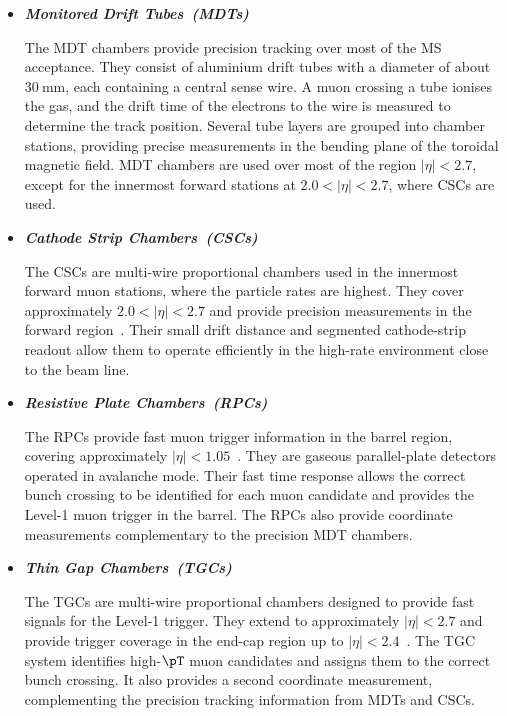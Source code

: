 \begin{itemize}
    \item \textbf{\textit{Monitored Drift Tubes~(MDTs)\quad}}

    The MDT chambers provide precision tracking over most of the MS acceptance.
    They consist of aluminium drift tubes with a diameter of about $30~\mathrm{mm}$, each containing a central sense wire.
    A muon crossing a tube ionises the gas, and the drift time of the electrons to the wire is measured to determine the track position.
    Several tube layers are grouped into chamber stations, providing precise measurements in the bending plane of the toroidal magnetic field.
    MDT chambers are used over most of the region $|\eta|<2.7$, except for the innermost forward stations at $2.0<|\eta|<2.7$, where CSCs are used.

    \item \textbf{\textit{Cathode Strip Chambers~(CSCs)\quad}}

    The CSCs are multi-wire proportional chambers used in the innermost forward muon stations, where the particle rates are highest.
    They cover approximately $2.0<|\eta|<2.7$ and provide precision measurements in the forward region~\cite{ATLASDetector2008}.
    Their small drift distance and segmented cathode-strip readout allow them to operate efficiently in the high-rate environment close to the beam line.

    \item \textbf{\textit{Resistive Plate Chambers~(RPCs)\quad}}

    The RPCs provide fast muon trigger information in the barrel region, covering approximately $|\eta|<1.05$~\cite{ATLASDetector2008}.
    They are gaseous parallel-plate detectors operated in avalanche mode.
    Their fast time response allows the correct bunch crossing to be identified for each muon candidate and provides the Level-1 muon trigger in the barrel.
    The RPCs also provide coordinate measurements complementary to the precision MDT chambers.

    \item \textbf{\textit{Thin Gap Chambers~(TGCs)\quad}}

    The TGCs are multi-wire proportional chambers designed to provide fast signals for the Level-1 trigger.
    They extend to approximately $|\eta|<2.7$ and provide trigger coverage in the end-cap region up to $|\eta|<2.4$~\cite{ATLASDetector2008}.
    The TGC system identifies high-$\pT$ muon candidates and assigns them to the correct bunch crossing.
    It also provides a second coordinate measurement, complementing the precision tracking information from MDTs and CSCs.
\end{itemize}

